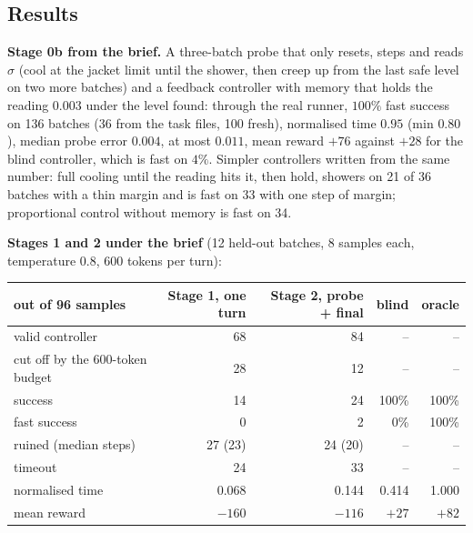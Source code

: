 \documentclass[11pt,a4paper]{article}
\begin{document}
\subsection*{Results}

\textbf{Stage 0b from the brief.} A three-batch probe that only resets,
steps and reads $\sigma$ (cool at the jacket limit until the shower, then
creep up from the last safe level on two more batches) and a feedback
controller with memory that holds the reading $0.003$ under the level
found: through the real runner, $100\%$ fast success on 136 batches (36 from
the task files, 100 fresh), normalised time $0.95$ (min $0.80$), median
probe error $0.004$, at most $0.011$, mean reward $+76$ against $+28$ for the
blind controller, which is fast on $4\%$. Simpler controllers written from
the same number: full cooling until the reading hits it, then hold, showers
on 21 of 36 batches with a thin margin and is fast on 33 with one step of
margin; proportional control without memory is fast on 34.

\textbf{Stages 1 and 2 under the brief} (12 held-out batches, 8 samples
each, temperature 0.8, 600 tokens per turn):

\begin{center}\small
\begin{tabular}{lrrrr}
\toprule
out of 96 samples & Stage 1, one turn & Stage 2, probe + final & blind & oracle \\
\midrule
valid controller                          & 68 & 84 & -- & -- \\
cut off by the 600-token budget           & 28 & 12 & -- & -- \\
success                                   & 14 & 24 & 100\% & 100\% \\
fast success                              & 0  & 2  & 0\% & 100\% \\
ruined (median steps)                     & 27 (23) & 24 (20) & -- & -- \\
timeout                                   & 24 & 33 & -- & -- \\
normalised time                           & 0.068 & 0.144 & 0.414 & 1.000 \\
mean reward                               & $-160$ & $-116$ & $+27$ & $+82$ \\
\bottomrule
\end{tabular}
\end{center}
\end{document}
